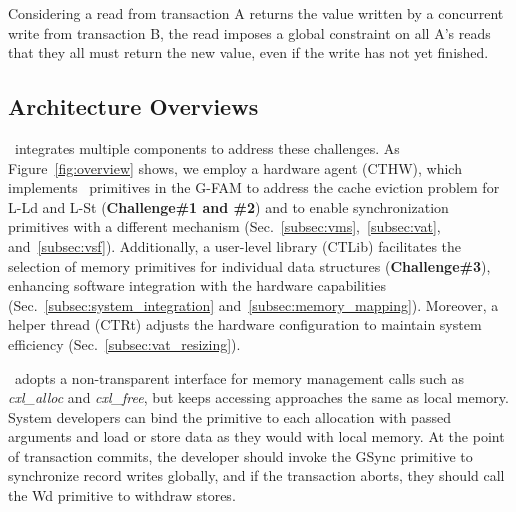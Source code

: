 \fi

\ifx\nocmt\undefined
Considering a read from transaction A returns the value written by a concurrent write from transaction B, the read imposes a global constraint on all A's reads that they all must return the new value, even if the write has not yet finished. 
\fi





\subsection{Architecture Overviews}

%

\name~integrates multiple components to address these challenges. 
As Figure~\ref{fig:overview} shows, we employ a hardware agent (CTHW), which implements \name~primitives in the G-FAM to address the cache eviction problem for L-Ld and L-St (\textbf{Challenge\#1 and \#2}) and to enable synchronization primitives with a different mechanism (Sec.~\ref{subsec:vms},~\ref{subsec:vat}, and~\ref{subsec:vsf}). 
Additionally, a user-level library (CTLib) facilitates the selection of memory primitives for individual data structures (\textbf{Challenge\#3}), enhancing software integration with the hardware capabilities (Sec.~\ref{subsec:system_integration} and~\ref{subsec:memory_mapping}). 
Moreover, a helper thread (CTRt) adjusts the hardware configuration to maintain system efficiency (Sec.~\ref{subsec:vat_resizing}). 

\name~adopts a non-transparent interface for memory management calls such as \textit{cxl\_alloc} and \textit{cxl\_free}, but keeps accessing approaches the same as local memory. System developers can bind the primitive to each allocation with passed arguments and load or store data as they would with local memory. At the point of transaction commits, the developer should invoke the GSync primitive to synchronize record writes globally, and if the transaction aborts, they should call the Wd primitive to withdraw stores.


